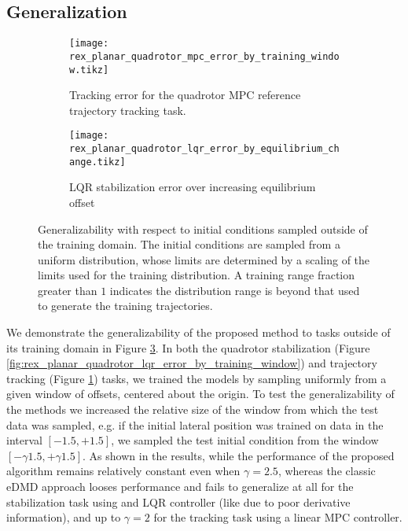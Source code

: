 \documentclass{article}
\begin{document}
\subsection{Generalization}
\begin{figure}[t] \centering
  \begin{subfigure}[t]{0.48\textwidth}
    \raggedright
    \texttt{[image: rex\_planar\_quadrotor\_mpc\_error\_by\_training\_window.tikz]}
    \caption{Tracking error for the quadrotor MPC reference trajectory tracking task.}
    \label{fig:rex_planar_quadrotor_mpc_error_by_training_window}
  \end{subfigure}
  \hfill
  \begin{subfigure}[t]{0.49\textwidth}
    \centering
    \texttt{[image: rex\_planar\_quadrotor\_lqr\_error\_by\_equilibrium\_change.tikz]}
    \caption{LQR stabilization error over increasing equilibrium offset}
    \label{fig:rex_planar_quadrotor_lqr_error_by_equilibrium_change}
  \end{subfigure}
  \caption{Generalizability with respect to initial conditions sampled outside of the 
  training domain. The initial conditions are sampled from a uniform distribution, whose 
  limits are determined by a scaling of the limits used for the training distribution. 
  A training range fraction greater than $1$ indicates the
  distribution range is beyond that used to generate the training trajectories.
  }
  \label{fig:training_window}
\end{figure}


We demonstrate the generalizability of the proposed method to tasks outside of its training
domain in Figure \ref{fig:training_window}. In both the quadrotor 
stabilization (Figure \ref{fig:rex_planar_quadrotor_lqr_error_by_training_window}) and 
trajectory tracking (Figure \ref{fig:rex_planar_quadrotor_mpc_error_by_training_window})
tasks, we trained the models by sampling uniformly from a given window of offsets, centered 
about the origin. 
To test the generalizability of the methods we increased the relative size of the window 
from which the test data was sampled, e.g. if the initial lateral position was trained on 
data in the interval $[-1.5,+1.5]$, we sampled the test initial condition from the window 
$[-\gamma 1.5, +\gamma 1.5]$. As shown in the results, while the performance of the proposed
algorithm remains relatively constant even when $\gamma = 2.5$, whereas the classic eDMD 
approach looses performance and fails to generalize at all for the stabilization task using 
and LQR controller (like due to poor derivative information), and up to $\gamma = 2$ for the 
tracking task using a linear MPC controller.
\end{document}

